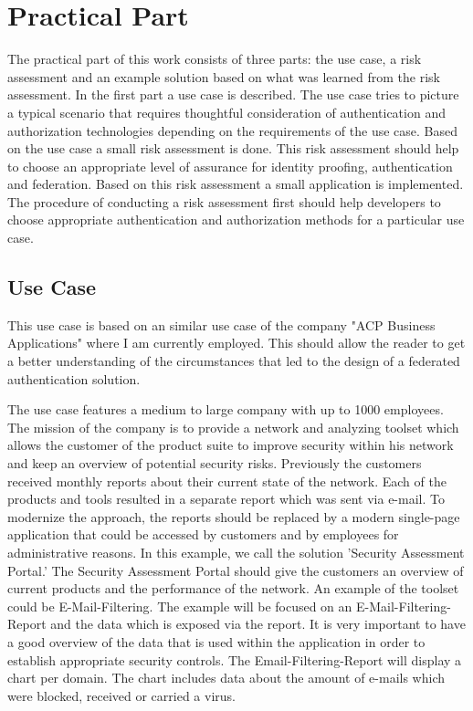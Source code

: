 \chapter{Practical Part}\label{chap:practicalPart}
\chapterstart

The practical part of this work consists of three parts: the use case, a risk assessment and an example solution based on what was learned from the risk assessment. In the first part a use case is described. The use case tries to picture a typical scenario that requires thoughtful consideration of authentication and authorization technologies depending on the requirements of the use case. Based on the use case a small risk assessment is done. This risk assessment should help to choose an appropriate level of assurance for identity proofing, authentication and federation. Based on this risk assessment a small application is implemented. The procedure of conducting a risk assessment first should help developers to choose appropriate authentication and authorization methods for a particular use case.  

\section{Use Case}
\label{usecase}
This use case is based on an similar use case of the company "ACP Business Applications" where I am currently employed. This should allow the reader to get a better understanding of the circumstances that led to the design of a federated authentication solution. 

The use case features a medium to large company with up to 1000 employees. The mission of the company is to provide a network and analyzing toolset which allows the customer of the product suite to improve security within his network and keep an overview of potential security risks. Previously the customers received monthly reports about their current state of the network. Each of the products and tools resulted in a separate report which was sent via e-mail. To modernize the approach, the reports should be replaced by a modern single-page application that could be accessed by customers and by employees for administrative reasons. In this example, we call the solution 'Security Assessment Portal.' The Security Assessment Portal should give the customers an overview of current products and the performance of the network. An example of the toolset could be E-Mail-Filtering. The example will be focused on an E-Mail-Filtering-Report and the data which is exposed via the report. It is very important to have a good overview of the data that is used within the application in order to establish appropriate security controls. The Email-Filtering-Report will display a chart per domain. The chart includes data about the amount of e-mails which were blocked, received or carried a virus. 

